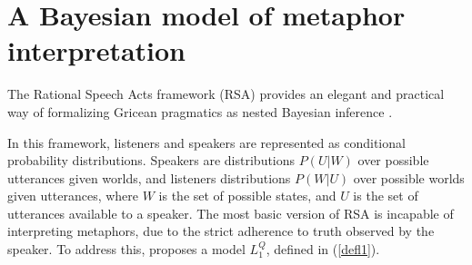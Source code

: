 \documentclass[OpenMind]{stjour}
\newcommand{\Listener}{L}
\newcommand{\QLONE}{\Listener_{{1}}^{{Q}}}
\begin{document}
\section{A Bayesian model of metaphor interpretation} \label{rsa}
	
	The Rational Speech Acts framework (RSA) provides an elegant and practical way of formalizing Gricean pragmatics as nested Bayesian inference \citep{frank2012predicting}.

	In this framework, listeners and speakers are represented as conditional probability distributions. Speakers are distributions $P(U\vert W)$ over possible utterances given worlds, and listeners distributions  $P(W\vert U)$ over possible worlds given utterances, where $W$ is the set of possible states, and $U$ is the set of utterances available to a speaker.
	The most basic version of RSA \citep{frank2012predicting} is incapable of interpreting metaphors, due to the strict adherence to truth observed by the speaker. To address this, \citet{kao} proposes a model $\QLONE$, defined in (\ref{defl1}). 






\end{document}
